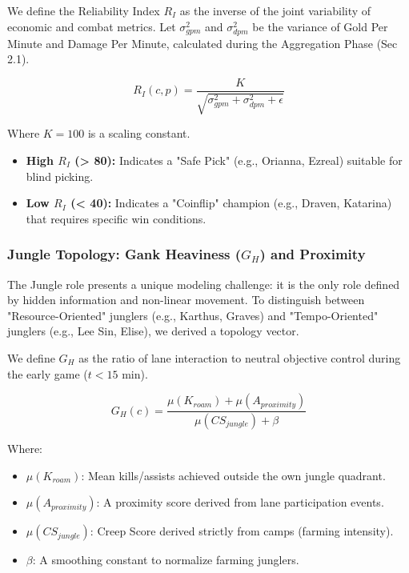 \documentclass[12pt, a4paper]{article}
\begin{document}
    We define the Reliability Index $R_I$ as the inverse of the joint variability of economic and combat metrics. Let $\sigma^2_{gpm}$ and $\sigma^2_{dpm}$ be the variance of Gold Per Minute and Damage Per Minute, calculated during the Aggregation Phase (Sec 2.1).

    \begin{equation}
        R_I(c,p) = \frac{K}{\sqrt{\sigma^2_{gpm} + \sigma^2_{dpm} + \epsilon}}
    \end{equation}

    Where $K=100$ is a scaling constant.
    \begin{itemize}
        \item \textbf{High $R_I$ (> 80):} Indicates a "Safe Pick" (e.g., Orianna, Ezreal) suitable for blind picking.
        \item \textbf{Low $R_I$ (< 40):} Indicates a "Coinflip" champion (e.g., Draven, Katarina) that requires specific win conditions.
    \end{itemize}

    \subsubsection{Jungle Topology: Gank Heaviness ($G_H$) and Proximity}
    The Jungle role presents a unique modeling challenge: it is the only role defined by hidden information and non-linear movement. To distinguish between "Resource-Oriented" junglers (e.g., Karthus, Graves) and "Tempo-Oriented" junglers (e.g., Lee Sin, Elise), we derived a topology vector.

    We define $G_H$ as the ratio of lane interaction to neutral objective control during the early game ($t < 15 \text{ min}$).

    \begin{equation}
        G_H(c) = \frac{\mu(K_{roam}) + \mu(A_{proximity})}{\mu(CS_{jungle}) + \beta}
    \end{equation}

    Where:
    \begin{itemize}
        \item $\mu(K_{roam})$: Mean kills/assists achieved outside the own jungle quadrant.
        \item $\mu(A_{proximity})$: A proximity score derived from lane participation events.
        \item $\mu(CS_{jungle})$: Creep Score derived strictly from camps (farming intensity).
        \item $\beta$: A smoothing constant to normalize farming junglers.
    \end{itemize}
\end{document}
